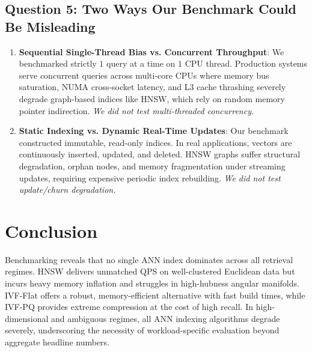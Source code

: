 \documentclass[10pt,twocolumn,a4paper]{article}
\begin{document}
\subsection{Question 5: Two Ways Our Benchmark Could Be Misleading}
\begin{enumerate}
    \item \textbf{Sequential Single-Thread Bias vs. Concurrent Throughput}: We benchmarked strictly $1$ query at a time on $1$ CPU thread. Production systems serve concurrent queries across multi-core CPUs where memory bus saturation, NUMA cross-socket latency, and L3 cache thrashing severely degrade graph-based indices like HNSW, which rely on random memory pointer indirection. \textit{We did not test multi-threaded concurrency.}
    \item \textbf{Static Indexing vs. Dynamic Real-Time Updates}: Our benchmark constructed immutable, read-only indices. In real applications, vectors are continuously inserted, updated, and deleted. HNSW graphs suffer structural degradation, orphan nodes, and memory fragmentation under streaming updates, requiring expensive periodic index rebuilding. \textit{We did not test update/churn degradation.}
\end{enumerate}

\section{Conclusion}
Benchmarking reveals that no single ANN index dominates across all retrieval regimes. HNSW delivers unmatched QPS on well-clustered Euclidean data but incurs heavy memory inflation and struggles in high-hubness angular manifolds. IVF-Flat offers a robust, memory-efficient alternative with fast build times, while IVF-PQ provides extreme compression at the cost of high recall. In high-dimensional and ambiguous regimes, all ANN indexing algorithms degrade severely, underscoring the necessity of workload-specific evaluation beyond aggregate headline numbers.
\end{document}
